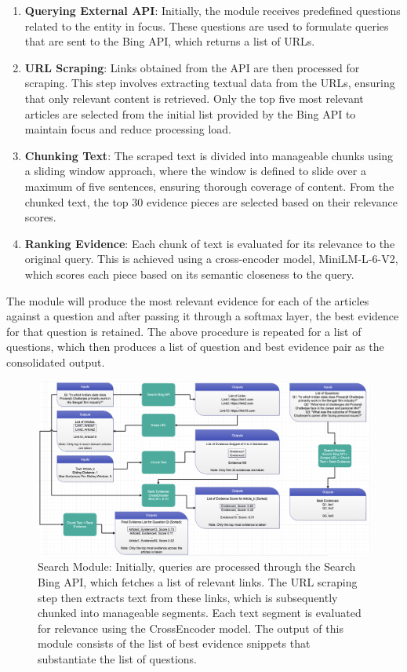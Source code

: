 \documentclass[11pt]{article}
\begin{document}
	\begin{enumerate}
		\item \textbf{Querying External API}: Initially, the module receives predefined questions related to the entity in focus. These questions are used to formulate queries that are sent to the Bing API, which returns a list of URLs.
		\item \textbf{URL Scraping}: Links obtained from the API are then processed for scraping. This step involves extracting textual data from the URLs, ensuring that only relevant content is retrieved. Only the top five most relevant articles are selected from the initial list provided by the Bing API to maintain focus and reduce processing load.
		\item \textbf{Chunking Text}: The scraped text is divided into manageable chunks using a sliding window approach, where the window is defined to slide over a maximum of five sentences, ensuring thorough coverage of content. From the chunked text, the top 30 evidence pieces are selected based on their relevance scores.
		\item \textbf{Ranking Evidence}: Each chunk of text is evaluated for its relevance to the original query. This is achieved using a cross-encoder model, MiniLM-L-6-V2, which scores each piece based on its semantic closeness to the query.
	\end{enumerate}
	
	The module will produce the most relevant evidence for each of the articles against a question and after passing it through a softmax layer, the best evidence for that question is retained. The above procedure is repeated for a list of questions, which then produces a list of question and best evidence pair as the consolidated output.

	\begin{figure}[tbh]
		\centering
		\includegraphics[width=\textwidth]{module4}
		\caption{Search Module: Initially, queries are processed through the Search Bing API, which fetches a list of relevant links. The URL scraping step then extracts text from these links, which is subsequently chunked into manageable segments. Each text segment is evaluated for relevance using the CrossEncoder model. The output of this module consists of the list of best evidence snippets that substantiate the list of questions.}
		\label{F:module4}
	\end{figure}
	
\end{document}
